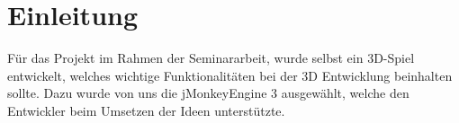 \chapter{Einleitung}\label{ch:einleitung}
Für das Projekt im 
Rahmen der Seminararbeit, wurde selbst ein 3D-Spiel entwickelt, welches wichtige Funktionalitäten bei der 3D Entwicklung beinhalten sollte. Dazu wurde von uns die jMonkeyEngine 3 ausgewählt, welche den Entwickler beim Umsetzen der Ideen unterstützte.



